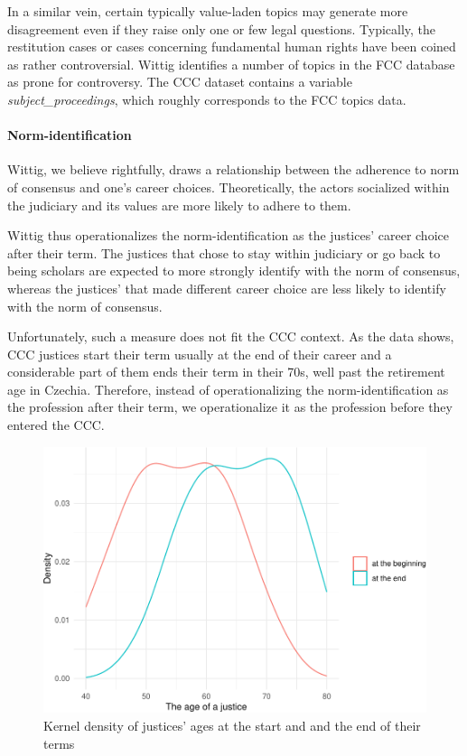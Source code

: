 \documentclass[
  11pt,
]{article}
\begin{document}
In a similar vein, certain typically value-laden topics may generate
more disagreement even if they raise only one or few legal questions.
Typically, the restitution cases or cases concerning fundamental human
rights have been coined as rather controversial. Wittig identifies a
number of topics in the FCC database as prone for controversy. The CCC
dataset contains a variable \emph{subject\_proceedings}, which roughly
corresponds to the FCC topics data.

\hypertarget{norm-identification}{%
\paragraph{Norm-identification}\label{norm-identification}}

Wittig, we believe rightfully, draws a relationship between the
adherence to norm of consensus and one's career choices. Theoretically,
the actors socialized within the judiciary and its values are more
likely to adhere to them.

Wittig thus operationalizes the norm-identification as the justices'
career choice after their term. The justices that chose to stay within
judiciary or go back to being scholars are expected to more strongly
identify with the norm of consensus, whereas the justices' that made
different career choice are less likely to identify with the norm of
consensus.

Unfortunately, such a measure does not fit the CCC context. As the data
shows, CCC justices start their term usually at the end of their career
and a considerable part of them ends their term in their 70s, well past
the retirement age in Czechia. Therefore, instead of operationalizing
the norm-identification as the profession after their term, we
operationalize it as the profession before they entered the CCC.

\begin{figure}
\centering
\includegraphics{separate_opinions_files/figure-latex/unnamed-chunk-3-1.pdf}
\caption{Kernel density of justices' ages at the start and and the end
of their terms}
\end{figure}
\end{document}
